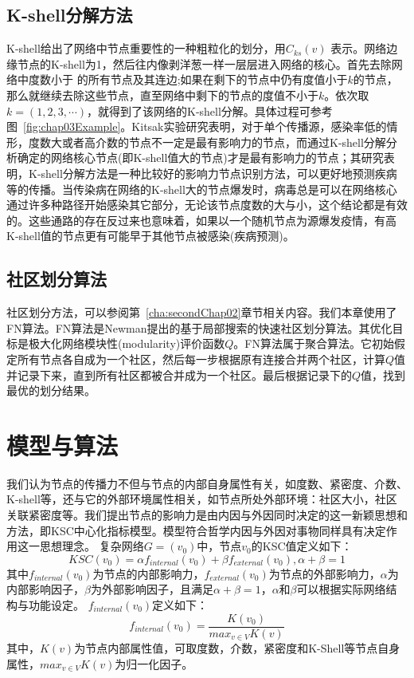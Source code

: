 \subsection{K-shell分解方法}
K-shell给出了网络中节点重要性的一种粗粒化的划分，用$C_{ks}(v)$ 表示。网络边缘节点的K-shell为1，然后往内像剥洋葱一样一层层进入网络的核心。首先去除网络中度数小于 的所有节点及其连边;如果在剩下的节点中仍有度值小于$k$的节点，那么就继续去除这些节点，直至网络中剩下的节点的度值不小于$k$。依次取$k=(1,2,3,\cdots)$，就得到了该网络的K-shell分解。具体过程可参考图~\ref{fig:chap03Example}。Kitsak\cite{kitsak2010identification}实验研究表明，对于单个传播源，感染率低的情形，度数大或者高介数的节点不一定是最有影响力的节点，而通过K-shell分解分析确定的网络核心节点(即K-shell值大的节点)才是最有影响力的节点；其研究表明，K-shell分解方法是一种比较好的影响力节点识别方法，可以更好地预测疾病等的传播。当传染病在网络的K-shell大的节点爆发时，病毒总是可以在网络核心通过许多种路径开始感染其它部分，无论该节点度数的大与小，这个结论都是有效的。这些通路的存在反过来也意味着，如果以一个随机节点为源爆发疫情，有高 K-shell值的节点更有可能早于其他节点被感染(疾病预测)。
\subsection{社区划分算法}
社区划分方法，可以参阅第~\ref{cha:secondChap02}章节相关内容。我们本章使用了FN算法\cite{newman2004finding}。FN算法是Newman提出的基于局部搜索的快速社区划分算法。其优化目标是极大化网络模块性(modularity)评价函数$Q$。FN算法属于聚合算法。它初始假定所有节点各自成为一个社区，然后每一步根据原有连接合并两个社区，计算$Q$值并记录下来，直到所有社区都被合并成为一个社区。最后根据记录下的$Q$值，找到最优的划分结果。

\section{模型与算法}
我们认为节点的传播力不但与节点的内部自身属性有关，如度数、紧密度、介数、K-shell等，还与它的外部环境属性相关，如节点所处外部环境：社区大小，社区关联紧密度等。我们提出节点的影响力是由内因与外因同时决定的这一新颖思想和方法，即KSC中心化指标模型。模型符合哲学内因与外因对事物同样具有决定作用这一思想理念。
复杂网络$G=(v_0)$中，节点$v_0$的KSC值定义如下：
\begin{equation} 
\label{equ:chap3:KSCModel}
KSC(v_0)=\alpha f_{internal}(v_0) + \beta f_{external}(v_0), \alpha + \beta =1
\end{equation}
其中$f_{internal}(v_0)$为节点的内部影响力，$f_{external}(v_0)$为节点的外部影响力，$\alpha$为内部影响因子，$\beta$为外部影响因子，且满足$\alpha + \beta =1$，$\alpha$和$\beta$可以根据实际网络结构与功能设定。 
$f_{internal}(v_0)$定义如下：
\begin{equation} 
\label{equ:chap3:KSCinternal}
f_{internal}(v_0) = \frac{K(v_0)}{max_{v\in V}K(v)}
\end{equation}
其中，$K(v)$为节点内部属性值，可取度数，介数，紧密度和K-Shell等节点自身属性，$max_{v\in V}K(v)$为归一化因子。

